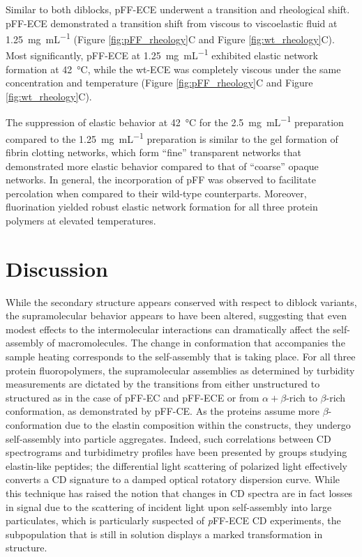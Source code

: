 \begin{refsection}
Similar to both diblocks, pFF-ECE underwent a transition and rheological shift.
pFF-ECE demonstrated a transition shift from viscous to viscoelastic fluid at
\SI{1.25}{\mg\per\mL} (Figure \ref{fig:pFF_rheology}C and Figure
\ref{fig:wt_rheology}C). Most significantly, pFF-ECE at
\SI{1.25}{\mg\per\mL} exhibited elastic network formation at
\SI{42}{\celsius}, while the wt-ECE was completely viscous under the same
concentration and temperature (Figure \ref{fig:pFF_rheology}C and Figure
\ref{fig:wt_rheology}C).

The suppression of elastic behavior at \SI{42}{\celsius} for the
\SI{2.5}{\mg\per\mL} preparation compared to the \SI{1.25}{\mg\per\mL}
preparation is similar to the gel formation of fibrin clotting networks, which
form ``fine'' transparent networks that demonstrated more elastic behavior
compared to that of ``coarse'' opaque networks.\cite{Clark1987} In general, the
incorporation of pFF was observed to facilitate percolation when compared to
their wild-type counterparts. Moreover, fluorination yielded robust elastic
network formation for all three protein polymers at elevated temperatures. 

\section{Discussion}

While the secondary structure appears conserved with respect to diblock
variants, the supramolecular behavior appears to have been altered, suggesting
that even modest effects to the intermolecular interactions can dramatically
affect the self-assembly of macromolecules.\cite{URRY1974} The change in
conformation that accompanies the sample heating corresponds to the
self-assembly that is taking place. For all three protein fluoropolymers, the
supramolecular assemblies as determined by turbidity measurements are dictated
by the transitions from either unstructured to structured as in the case of
pFF-EC and pFF-ECE or from ${\alpha+\beta}$-rich to ${\beta}$-rich conformation,
as demonstrated by pFF-CE. As the proteins assume more ${\beta}$- conformation
due to the elastin composition within the constructs, they undergo self-assembly
into particle aggregates. Indeed, such correlations between CD spectrograms and
turbidimetry profiles have been presented by groups studying elastin-like
peptides; the differential light scattering of polarized light effectively
converts a CD signature to a damped optical rotatory dispersion curve. While
this technique has raised the notion that changes in CD spectra are in fact
losses in signal due to the scattering of incident light upon self-assembly into
large particulates, which is particularly suspected of \emph{p}FF-ECE CD
experiments, the subpopulation that is still in solution displays a marked
transformation in structure.


\end{refsection}
